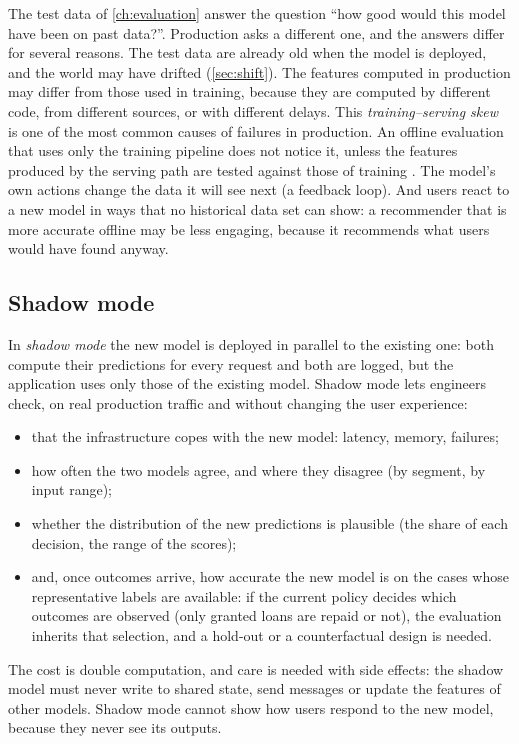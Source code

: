 The test data of \cref{ch:evaluation} answer the question ``how good would this model have been on past data?''.
Production asks a different one, and the answers differ for several reasons. The test data are already old when the
model is deployed, and the world may have drifted (\cref{sec:shift}). The features computed in production may differ
from those used in training, because they are computed by different code, from different sources, or with different
delays. This \emph{training--serving skew} is one of the most common causes of failures in production. An offline evaluation that uses only the training pipeline does not notice it, unless the features produced by
the serving path are tested against those of training \citep{breck2019data}. The model's own actions change the data it will see next (a feedback loop).
And users react to a new model in ways that no historical data set can show: a recommender that is more accurate
offline may be less engaging, because it recommends what users would have found anyway.

\subsection{Shadow mode}

In \emph{shadow mode} the new model is deployed in parallel to the existing one: both compute their predictions for
every request and both are logged, but the application uses only those of the existing model. Shadow mode lets
engineers check, on real production traffic and without changing the user experience:
\begin{itemize}
  \item that the infrastructure copes with the new model: latency, memory, failures;
  \item how often the two models agree, and where they disagree (by segment, by input range);
  \item whether the distribution of the new predictions is plausible (the share of each decision, the range of the
        scores);
  \item and, once outcomes arrive, how accurate the new model is on the cases whose representative labels
        are available: if the current policy decides which outcomes are observed (only granted loans are
        repaid or not), the evaluation inherits that selection, and a hold-out or a counterfactual design is
        needed.
\end{itemize}
The cost is double computation, and care is needed with side effects: the shadow model must never write to shared
state, send messages or update the features of other models. Shadow mode cannot show how users
respond to the new model, because they never see its outputs.

